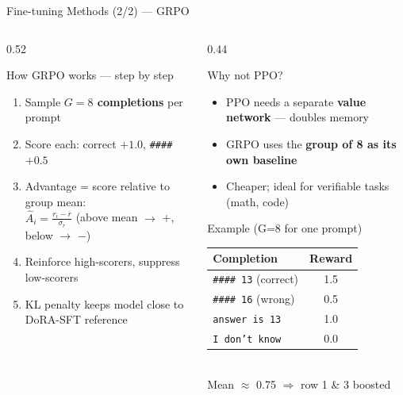\documentclass[aspectratio=169,10pt]{beamer}
\begin{document}
\begin{frame}{Fine-tuning Methods (2/2) — GRPO}

  \begin{columns}[T]
    \begin{column}{0.52\textwidth}
      \begin{block}{How GRPO works — step by step}
        \small
        \begin{enumerate}
          \item Sample \textbf{$G=8$ completions} per prompt
          \item Score each: correct $+1.0$, \texttt{\#\#\#\#} $+0.5$
          \item Advantage = score relative to group mean:\\[1pt]
                $\hat{A}_i = \frac{r_i - \bar{r}}{\sigma_r}$ \quad
                \footnotesize(above mean $\to$ +, below $\to$ $-$)
          \item \small Reinforce high-scorers, suppress low-scorers
          \item KL penalty keeps model close to DoRA-SFT reference
        \end{enumerate}
      \end{block}
    \end{column}

    \begin{column}{0.44\textwidth}
      \begin{block}{Why not PPO?}
        \begin{itemize}\small
          \item PPO needs a separate \textbf{value network} — doubles memory
          \item GRPO uses the \textbf{group of 8 as its own baseline}
          \item Cheaper; ideal for verifiable tasks (math, code)
        \end{itemize}
      \end{block}

      \vspace{0.3em}
      \begin{exampleblock}{Example (G=8 for one prompt)}
        \footnotesize
        \begin{tabular}{lc}
          Completion & Reward \\
          \hline
          \texttt{\#\#\#\# 13} (correct) & 1.5 \\
          \texttt{\#\#\#\# 16} (wrong)   & 0.5 \\
          \texttt{answer is 13} & 1.0 \\
          \texttt{I don't know} & 0.0 \\
        \end{tabular}\\[2pt]
        Mean $\approx$ 0.75 $\Rightarrow$ row 1 \& 3 boosted
      \end{exampleblock}
    \end{column}
  \end{columns}
\end{frame}
\end{document}
